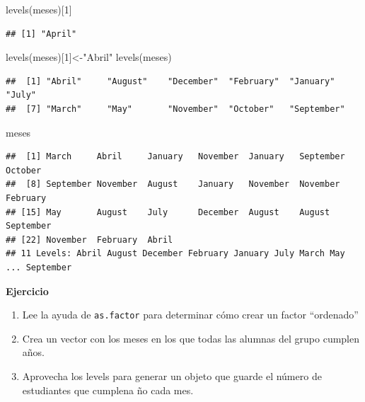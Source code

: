 \documentclass[
]{book}
\newenvironment{Shaded}{\begin{snugshade}}{\end{snugshade}}
\newcommand{\DecValTok}[1]{\textcolor[rgb]{0.00,0.00,0.81}{#1}}
\newcommand{\FunctionTok}[1]{\textcolor[rgb]{0.00,0.00,0.00}{#1}}
\newcommand{\NormalTok}[1]{#1}
\newcommand{\OtherTok}[1]{\textcolor[rgb]{0.56,0.35,0.01}{#1}}
\newcommand{\StringTok}[1]{\textcolor[rgb]{0.31,0.60,0.02}{#1}}
\providecommand{\tightlist}{%
  \setlength{\itemsep}{0pt}\setlength{\parskip}{0pt}}
\begin{document}
\begin{Shaded}
\begin{Highlighting}[]
\FunctionTok{levels}\NormalTok{(meses)[}\DecValTok{1}\NormalTok{]}
\end{Highlighting}
\end{Shaded}

\begin{verbatim}
## [1] "April"
\end{verbatim}

\begin{Shaded}
\begin{Highlighting}[]
\FunctionTok{levels}\NormalTok{(meses)[}\DecValTok{1}\NormalTok{]}\OtherTok{\textless{}{-}}\StringTok{"Abril"}
\FunctionTok{levels}\NormalTok{(meses)}
\end{Highlighting}
\end{Shaded}

\begin{verbatim}
##  [1] "Abril"     "August"    "December"  "February"  "January"   "July"     
##  [7] "March"     "May"       "November"  "October"   "September"
\end{verbatim}

\begin{Shaded}
\begin{Highlighting}[]
\NormalTok{meses}
\end{Highlighting}
\end{Shaded}

\begin{verbatim}
##  [1] March     Abril     January   November  January   September October  
##  [8] September November  August    January   November  November  February 
## [15] May       August    July      December  August    August    September
## [22] November  February  Abril    
## 11 Levels: Abril August December February January July March May ... September
\end{verbatim}

\textbf{Ejercicio}

\begin{enumerate}
\def\labelenumi{\arabic{enumi}.}
\tightlist
\item
  Lee la ayuda de \texttt{as.factor} para determinar cómo crear un factor ``ordenado''
\item
  Crea un vector con los meses en los que todas las alumnas del grupo cumplen años.
\item
  Aprovecha los levels para generar un objeto que guarde el número de estudiantes que cumplena ño cada mes.
\end{enumerate}
\end{document}
